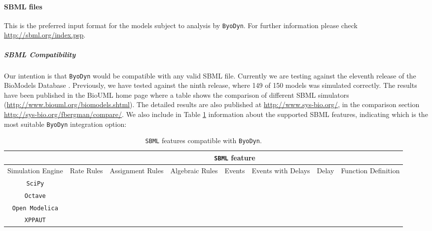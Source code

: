 \documentclass[a4paper, 11pt]{article}
\newcommand{\tick}{\ding{52}}
\newcommand{\cross}{\ding{56}}
\begin{document}
\paragraph{SBML files}
This is the preferred input format for the models subject to analysis by \texttt{ByoDyn}.
For further information please check \\\url{http://sbml.org/index.psp}.
\subparagraph{SBML Compatibility}
Our intention is that \texttt{ByoDyn} would be compatible with any valid SBML\citep{hucka03} file.
Currently we are testing against the eleventh release of the BioModels Database
\citep{lenovere06}. Previously, we have tested against the ninth release, where 149 of 150 models was simulated correctly.
The results have been published in the BioUML home page where a table shows the comparison of different SBML simulators (\url{http://www.biouml.org/biomodels.shtml}).
The detailed results are also published at \url{http://www.sys-bio.org/}, in the comparison section \url{http://sys-bio.org/fbergman/compare/}.
We also include in Table \ref{sbmlCompatibilityTable} information about the supported SBML features, indicating which is the most suitable \texttt{ByoDyn} integration option:
\begin{landscape}
  \begin{table}
    \begin{tabular}{c||ccccccc}
      &\multicolumn{7}{c}{\texttt{SBML} feature}\\
      \hline
      Simulation Engine&Rate Rules&Assignment Rules&Algebraic Rules&Events&Events with Delays&Delay&Function Definition\\
      \hline
      \hline
      \texttt{SciPy}&\tick&\cross&\cross&\cross&\cross&\cross&\tick\\
      \texttt{Octave}&\tick&\tick&\tick&\cross&\cross&\cross&\tick\\
      \texttt{Open Modelica}&\tick&\tick&\tick&\tick&\tick&\cross&\tick\\
      \texttt{XPPAUT}&\tick&\tick&\cross&\cross&\cross&\tick&\tick\\
    \end{tabular}
    \caption{\footnotesize
      \texttt{SBML} features compatible with \texttt{ByoDyn}.
      \label{sbmlCompatibilityTable}}
  \end{table}
\end{landscape}
\end{document}

